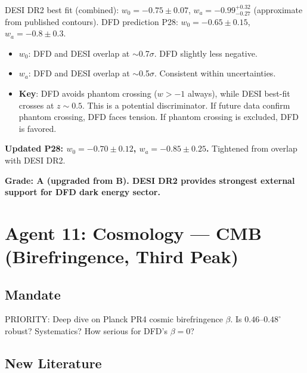 \documentclass[11pt,a4paper]{article}
\begin{document}
DESI DR2 best fit (combined): $w_0 = -0.75 \pm 0.07$, $w_a = -0.99^{+0.32}_{-0.27}$ (approximate from published contours). DFD prediction P28: $w_0 = -0.65 \pm 0.15$, $w_a = -0.8 \pm 0.3$.

\begin{itemize}
\item $w_0$: DFD and DESI overlap at $\sim$0.7$\sigma$. DFD slightly less negative.
\item $w_a$: DFD and DESI overlap at $\sim$0.5$\sigma$. Consistent within uncertainties.
\item \textbf{Key}: DFD avoids phantom crossing ($w > -1$ always), while DESI best-fit crosses at $z\sim0.5$. This is a potential discriminator. If future data confirm phantom crossing, DFD faces tension. If phantom crossing is excluded, DFD is favored.
\end{itemize}

\textbf{Updated P28: $w_0 = -0.70 \pm 0.12$, $w_a = -0.85 \pm 0.25$.} Tightened from overlap with DESI DR2.

\textbf{Grade: A (upgraded from B). DESI DR2 provides strongest external support for DFD dark energy sector.}

\section{Agent 11: Cosmology --- CMB (Birefringence, Third Peak)}

\subsection{Mandate}
PRIORITY: Deep dive on Planck PR4 cosmic birefringence $\beta$. Is $0.46$--$0.48^\circ$ robust? Systematics? How serious for DFD's $\beta=0$?

\subsection{New Literature}
\end{document}
